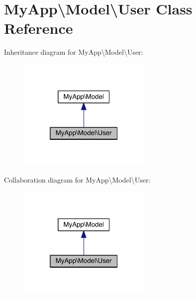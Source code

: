 \hypertarget{class_my_app_1_1_model_1_1_user}{}\section{My\+App\textbackslash{}Model\textbackslash{}User Class Reference}
\label{class_my_app_1_1_model_1_1_user}


Inheritance diagram for My\+App\textbackslash{}Model\textbackslash{}User\+:\nopagebreak
\begin{figure}[H]
\begin{center}
\leavevmode
\includegraphics[width=181pt]{class_my_app_1_1_model_1_1_user__inherit__graph}
\end{center}
\end{figure}


Collaboration diagram for My\+App\textbackslash{}Model\textbackslash{}User\+:\nopagebreak
\begin{figure}[H]
\begin{center}
\leavevmode
\includegraphics[width=181pt]{class_my_app_1_1_model_1_1_user__coll__graph}
\end{center}
\end{figure}
